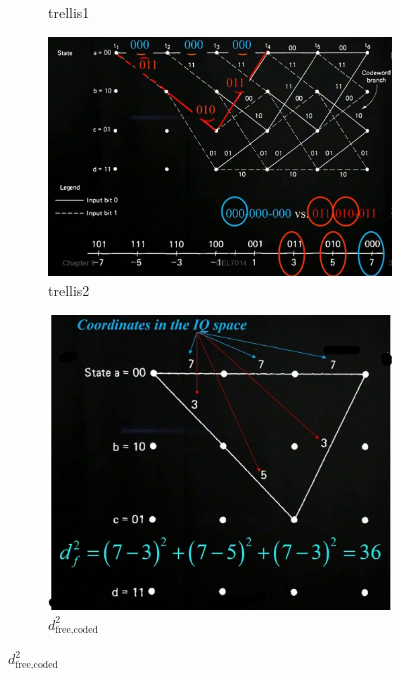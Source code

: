 \begin{figure}[hbt!]
\begin{subfigure}[t]{0.49\linewidth}
        \caption{trellis1}\label{subfig:trellis1}
    \end{subfigure}
    \begin{subfigure}[t]{0.49\linewidth}
        \includegraphics[width=1\textwidth]{images/trellis/trellis_example3.jpg}
        \caption{trellis2}\label{subfig:trellis2}
    \end{subfigure}
    \hfil
    \begin{subfigure}[t]{0.4\linewidth}
        \includegraphics[width=1\textwidth]{images/trellis/trellis_example4.jpg}
        \caption{$d_{\text {free,coded }}^2$}\label{subfig:free_coded}
    \end{subfigure}

\end{figure}
